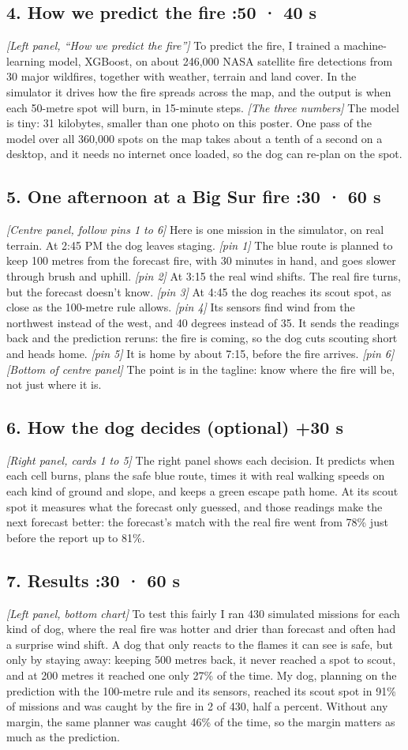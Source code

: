 \documentclass[11pt]{article}
\newcommand{\cue}[1]{{\color{cue}\itshape [#1]}}
\newcommand{\talkpart}[2]{\subsection{#1 \hfill {\normalsize\color{cue}\mdseries #2}}}
\begin{document}
\talkpart{4. How we predict the fire}{1:50 · 40 s}
\cue{Left panel, ``How we predict the fire''}
To predict the fire, I trained a machine-learning model, XGBoost, on about 246,000 NASA satellite fire detections from 30 major wildfires, together with weather, terrain and land cover. In the simulator it drives how the fire spreads across the map, and the output is when each 50-metre spot will burn, in 15-minute steps.
\cue{The three numbers}
The model is tiny: 31 kilobytes, smaller than one photo on this poster. One pass of the model over all 360,000 spots on the map takes about a tenth of a second on a desktop, and it needs no internet once loaded, so the dog can re-plan on the spot.

\talkpart{5. One afternoon at a Big Sur fire}{2:30 · 60 s}
\cue{Centre panel, follow pins 1 to 6}
Here is one mission in the simulator, on real terrain.
At 2:45 PM the dog leaves staging. \cue{pin 1} The blue route is planned to keep 100 metres from the forecast fire, with 30 minutes in hand, and goes slower through brush and uphill. \cue{pin 2}
At 3:15 the real wind shifts. The real fire turns, but the forecast doesn't know. \cue{pin 3}
At 4:45 the dog reaches its scout spot, as close as the 100-metre rule allows. \cue{pin 4}
Its sensors find wind from the northwest instead of the west, and 40 degrees instead of 35. It sends the readings back and the prediction reruns: the fire is coming, so the dog cuts scouting short and heads home. \cue{pin 5}
It is home by about 7:15, before the fire arrives. \cue{pin 6}
\cue{Bottom of centre panel}
The point is in the tagline: know where the fire will be, not just where it is.

\talkpart{6. How the dog decides (optional)}{+30 s}
\cue{Right panel, cards 1 to 5}
The right panel shows each decision. It predicts when each cell burns, plans the safe blue route, times it with real walking speeds on each kind of ground and slope, and keeps a green escape path home. At its scout spot it measures what the forecast only guessed, and those readings make the next forecast better: the forecast's match with the real fire went from 78\% just before the report up to 81\%.

\talkpart{7. Results}{3:30 · 60 s}
\cue{Left panel, bottom chart}
To test this fairly I ran 430 simulated missions for each kind of dog, where the real fire was hotter and drier than forecast and often had a surprise wind shift.
A dog that only reacts to the flames it can see is safe, but only by staying away: keeping 500 metres back, it never reached a spot to scout, and at 200 metres it reached one only 27\% of the time.
My dog, planning on the prediction with the 100-metre rule and its sensors, reached its scout spot in 91\% of missions and was caught by the fire in 2 of 430, half a percent.
Without any margin, the same planner was caught 46\% of the time, so the margin matters as much as the prediction.
\end{document}
